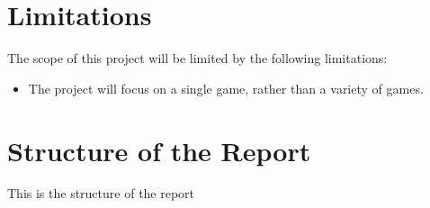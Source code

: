 \section{Limitations}
The scope of this project will be limited by the following limitations:
\begin{itemize}
    \item The project will focus on a single game, rather than a variety of games.
\end{itemize}

\section{Structure of the Report}

This is the structure of the report